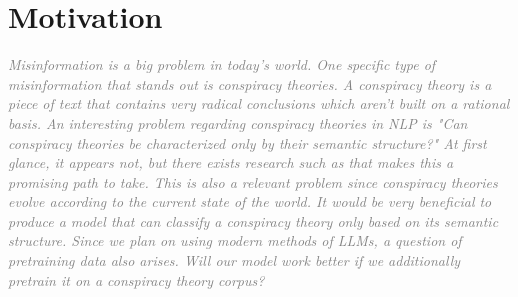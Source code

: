 \documentclass[11pt, a4paper]{article}
\newif\ifinstructions
\newcommand{\explain}[1]{%
  \ifinstructions
    \par\vspace{2pt}%
    {\small\color{exgray} #1}%
    \par\vspace{2pt}%
  \fi
}
\newcommand{\guideline}[1]{%
  \ifinstructions
    \par\vspace{3pt}%
    {\small\color{exgray}\textit{#1}}%
    \par\vspace{1pt}%
  \fi
}
\newcommand{\example}[1]{%
  \ifinstructions
    \par\vspace{1pt}%
    {\small\color{exblue} #1}%
    \par\vspace{4pt}%
  \fi
}
\newcommand{\keyphrase}[1]{%
  \ifinstructions
    \sethlcolor{highlight}\hl{#1}%
  \else
    #1%
  \fi
}
\newcommand{\fillhere}[1]{%
  \par\vspace{2pt}%
  \textit{\textcolor{gray}{#1}}%
  \par\vspace{2pt}%
}
\begin{document}
{%
\section{Motivation}

\explain{If you can bring references to support your claims, do that. Feel free to use the phrases \keyphrase{highlighted in yellow} as is or their paraphrases.}

\guideline{Start big. What is the broad, general problem you are addressing? The bigger the better.}
\example{``The number of NLP publications has grown exponentially over the past decade \citep{joshi2020state, conneau2020xlmr}, and language diversity remains a fundamental challenge for the field.''}

\guideline{What particular, focused problem are you addressing?}
\example{``Despite this growth, the \keyphrase{main goal addressed by this paper} is understanding to what extent current pre-trained models generalize across typologically different languages without task-specific fine-tuning data.''}

\guideline{Why is this an important problem?}
\example{``\keyphrase{It is an important goal because} the majority of the world's languages are low-resource, and excluding them from NLP research perpetuates a language divide with real societal consequences \citep{joshi2020state, lauscher2020zero}.''}

\guideline{Why is this a non-trivial, hard problem?}
\example{``\keyphrase{This is hard to do because} language typology, script systems, and data availability interact in complex ways that make it difficult to predict when and why transfer succeeds or fails.''}

\fillhere{
Misinformation is a big problem in today's world. One specific type of misinformation that stands out is conspiracy theories. A conspiracy theory is a piece of text that contains very radical conclusions which aren't built on a rational basis. An interesting problem regarding conspiracy theories in NLP is "Can conspiracy theories be characterized only by their semantic structure?"
At first glance, it appears not, but there exists research such as \citep{fort2023bigfoot} that makes this a promising path to take. This is also a relevant problem since conspiracy theories evolve according to the current state of the world. It would be very beneficial to produce a model that can classify a conspiracy theory only based on its semantic structure. Since we plan on using modern methods of LLMs, a question of pretraining data also arises. Will our model work better if we additionally pretrain it on a conspiracy theory corpus?
}

}
\end{document}
